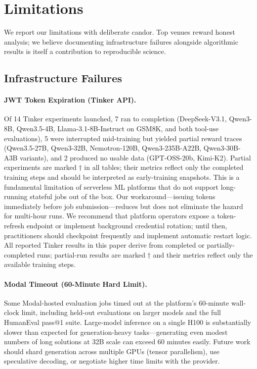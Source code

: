 \documentclass{article}
\begin{document}
\section{Limitations}
\label{sec:limitations}

We report our limitations with deliberate candor. Top venues reward honest
analysis; we believe documenting infrastructure failures alongside algorithmic
results is itself a contribution to reproducible science.

\subsection{Infrastructure Failures}
\label{sec:infra_failures}

\paragraph{JWT Token Expiration (Tinker API).}
Of 14 Tinker experiments launched, 7 ran to completion (DeepSeek-V3.1,
Qwen3-8B, Qwen3.5-4B, Llama-3.1-8B-Instruct on GSM8K, and both tool-use
evaluations), 5 were interrupted mid-training but yielded partial reward
traces (Qwen3.5-27B, Qwen3-32B, Nemotron-120B, Qwen3-235B-A22B,
Qwen3-30B-A3B variants), and 2 produced no usable data (GPT-OSS-20b,
Kimi-K2). Partial experiments are marked $\dagger$ in all tables; their
metrics reflect only the completed training steps and should be interpreted
as early-training snapshots. This is a fundamental
limitation of serverless ML platforms that do not support long-running
stateful jobs out of the box. Our workaround---issuing tokens immediately
before job submission---reduces but does not eliminate the hazard for
multi-hour runs. We recommend that platform operators expose a token-refresh
endpoint or implement background credential rotation; until then, practitioners
should checkpoint frequently and implement automatic restart logic. All
reported Tinker results in this paper derive from completed or partially-completed
runs; partial-run results are marked $\dagger$ and their metrics reflect
only the available training steps.

\paragraph{Modal Timeout (60-Minute Hard Limit).}
Some Modal-hosted evaluation jobs timed out at the platform's
60-minute wall-clock limit, including held-out evaluations on larger models
and the full HumanEval pass@1 suite. Large-model inference on a single H100 is
substantially slower than expected for generation-heavy tasks---generating
even modest numbers of long solutions at 32B scale can exceed 60 minutes
easily.
Future work should shard generation across multiple GPUs (tensor parallelism),
use speculative decoding, or negotiate higher time limits with the provider.
\end{document}
